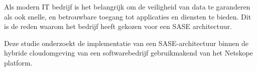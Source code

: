 




Als modern IT bedrijf is het belangrijk om de veiligheid van data te garanderen als ook snelle, en betrouwbare toegang tot applicaties en diensten te bieden. Dit is de reden waarom het bedrijf heeft gekozen voor een SASE architectuur.

\vspace{2ex}

Deze studie onderzoekt de implementatie van een SASE-architectuur binnen de hybride cloudomgeving van een softwarebedrijf gebruikmakend van het Netskope platform. 

